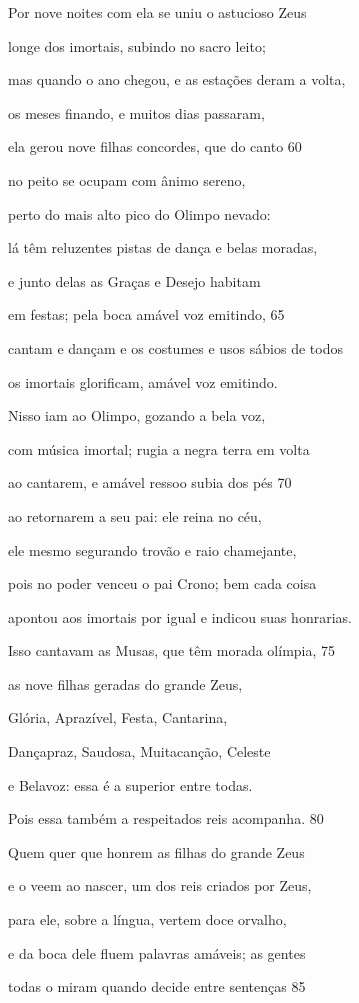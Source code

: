 Por nove noites com ela se uniu o astucioso Zeus

longe dos imortais, subindo no sacro leito;

mas quando o ano chegou, e as estações deram a volta,

os meses finando, e muitos dias passaram,

ela gerou nove filhas concordes, que do canto \num{60}

no peito se ocupam com ânimo sereno,

perto do mais alto pico do Olimpo nevado:

lá têm reluzentes pistas de dança e belas moradas,

e junto delas as Graças e Desejo habitam

em festas; pela boca amável voz emitindo, \num{65}

cantam e dançam e os costumes e usos sábios de todos

os imortais glorificam, amável voz emitindo.

Nisso iam ao Olimpo, gozando a bela voz,

com música imortal; rugia a negra terra em volta

ao cantarem, e amável ressoo subia dos pés \num{70}

ao retornarem a seu pai: ele reina no céu,

ele mesmo segurando trovão e raio chamejante,

pois no poder venceu o pai Crono; bem cada coisa

apontou aos imortais por igual e indicou suas honrarias.

\quad{}Isso cantavam as Musas, que têm morada olímpia, \num{75}

as nove filhas geradas do grande Zeus,

Glória, Aprazível, Festa, Cantarina,

Dançapraz, Saudosa, Muitacanção, Celeste

e Belavoz: essa é a superior entre todas.

Pois essa também a respeitados reis acompanha. \num{80}

Quem quer que honrem as filhas do grande Zeus

e o veem ao nascer, um dos reis criados por Zeus,

para ele, sobre a língua, vertem doce orvalho,

e da boca dele fluem palavras amáveis; as gentes

todas o miram quando decide entre sentenças \num{85}


